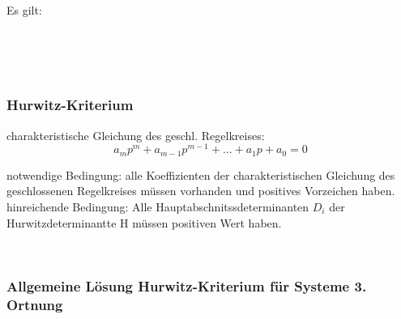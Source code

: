 Es gilt:

\begin{minipage}{0.45\textwidth}

 \\
 \\
 \\

\end{minipage}
\begin{minipage}{0.45\textwidth}

\end{minipage}

\subsubsection{Hurwitz-Kriterium}
charakteristische Gleichung des geschl. Regelkreises:
$$ a_mp^m + a_{m-1}p^{m-1}+ ... + a_1p+ a_0 = 0$$

notwendige Bedingung: alle Koeffizienten der charakteristischen Gleichung des geschlossenen Regelkreises müssen vorhanden und positives Vorzeichen haben. \\

hinreichende Bedingung: Alle Hauptabschnitssdeterminanten $D_i$
der Hurwitzdeterminantte H müssen positiven Wert haben.\\

\begin{minipage}{0.45\textwidth}

 \\
\end{minipage}
\begin{minipage}{0.45\textwidth}

\end{minipage}

\subsubsection{Allgemeine Lösung Hurwitz-Kriterium für Systeme 3. Ortnung}


